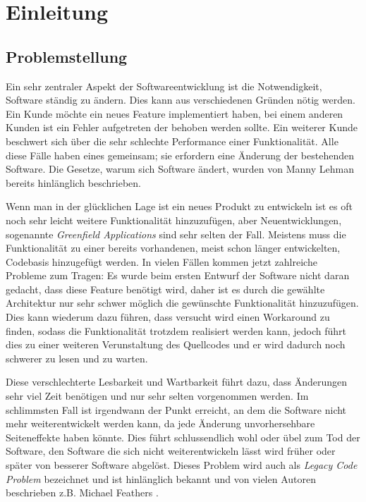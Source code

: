 \chapter{Einleitung}
\label{cha:Einleitung}

\section{Problemstellung}
\label{cha:Problemstellung}
Ein sehr zentraler Aspekt der Softwareentwicklung ist die Notwendigkeit, Software ständig zu ändern. Dies kann aus verschiedenen Gründen nötig werden. Ein Kunde möchte ein neues Feature implementiert haben, bei einem anderen Kunden ist ein Fehler aufgetreten der behoben werden sollte. Ein weiterer Kunde beschwert sich über die sehr schlechte Performance einer Funktionalität. Alle diese Fälle haben eines gemeinsam; sie erfordern eine Änderung der bestehenden Software. Die Gesetze, warum sich Software ändert, wurden von Manny Lehman \cite{Lehman1980} bereits hinlänglich beschrieben. 

Wenn man in der glücklichen Lage ist ein neues Produkt zu entwickeln ist es oft noch sehr leicht weitere Funktionalität hinzuzufügen, aber Neuentwicklungen, sogenannte \textit{ Greenfield Applications} sind sehr selten der Fall. Meistens muss die Funktionalität zu einer bereits vorhandenen, meist schon länger entwickelten, Codebasis hinzugefügt werden. In vielen Fällen kommen jetzt zahlreiche Probleme zum Tragen: Es wurde beim ersten Entwurf der Software nicht daran gedacht, dass diese Feature benötigt wird, daher ist es durch die gewählte Architektur nur sehr schwer möglich die gewünschte Funktionalität hinzuzufügen. Dies kann wiederum dazu führen, dass versucht wird einen Workaround zu finden, sodass die Funktionalität trotzdem realisiert werden kann, jedoch führt dies zu einer weiteren Verunstaltung des Quellcodes und er wird dadurch noch schwerer zu lesen und zu warten. 

Diese verschlechterte Lesbarkeit und Wartbarkeit führt dazu, dass Änderungen sehr viel Zeit benötigen und nur sehr selten vorgenommen werden. Im schlimmsten Fall ist irgendwann der Punkt erreicht, an dem die Software nicht mehr weiterentwickelt werden kann, da jede Änderung unvorhersehbare Seiteneffekte haben könnte. Dies führt schlussendlich wohl oder übel zum Tod der Software, den Software die sich nicht weiterentwickeln lässt wird früher oder später von besserer Software abgelöst. Dieses Problem wird auch als \textit{Legacy Code Problem} bezeichnet und ist hinlänglich bekannt und von vielen Autoren beschrieben z.B. Michael Feathers \cite{Feathers2013}.


